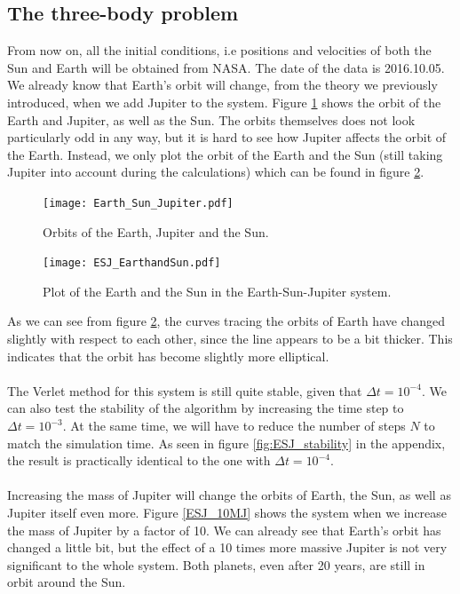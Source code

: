 \documentclass{article}
\begin{document}
\subsection{The three-body problem}
From now on, all the initial conditions, i.e positions and velocities of both the Sun and Earth will be obtained from NASA. The date of the data is 2016.10.05. We already know that Earth's orbit will change, from the theory we previously introduced, when we add Jupiter to the system. Figure \ref{fig:EJS_2D_Orbit} shows the orbit of the Earth and Jupiter, as well as the Sun. The orbits themselves does not look particularly odd in any way, but it is hard to see how Jupiter affects the orbit of the Earth. Instead, we only plot the orbit of the Earth and the Sun (still taking Jupiter into account during the calculations) which can be found in figure \ref{fig:EJS_Earth_and_sun}. \\
\begin{figure}[!h]
\centering
\texttt{[image: Earth\_Sun\_Jupiter.pdf]}
\caption{Orbits of the Earth, Jupiter and the Sun.}
\label{fig:EJS_2D_Orbit}
\end{figure}
\begin{figure}[!h]
\centering
\texttt{[image: ESJ\_EarthandSun.pdf]}
\caption{Plot of the Earth and the Sun in the Earth-Sun-Jupiter system.}
\label{fig:EJS_Earth_and_sun}
\end{figure}
As we can see from figure \ref{fig:EJS_Earth_and_sun}, the curves tracing the orbits of Earth have changed slightly with respect to each other, since the line appears to be a bit thicker. This indicates that the orbit has become slightly more elliptical. \\\\
The Verlet method for this system is still quite stable, given that $\Delta t = 10^{-4}$. We can also test the stability of the algorithm by increasing the time step to $\Delta t = 10^{-3}$. At the same time, we will have to reduce the number of steps $N$ to match the simulation time. As seen in figure \ref{fig:ESJ_stability} in the appendix, the result is practically identical to the one with $\Delta t = 10^{-4}$. \\\\
Increasing the mass of Jupiter will change the orbits of Earth, the Sun, as well as Jupiter itself even more. Figure \ref{ESJ_10MJ} shows the system when we increase the mass of Jupiter by a factor of 10. We can already see that Earth's orbit has changed a little bit, but the effect of a 10 times more massive Jupiter is not very significant to the whole system. Both planets, even after 20 years, are still in orbit around the Sun. \\
\end{document}
